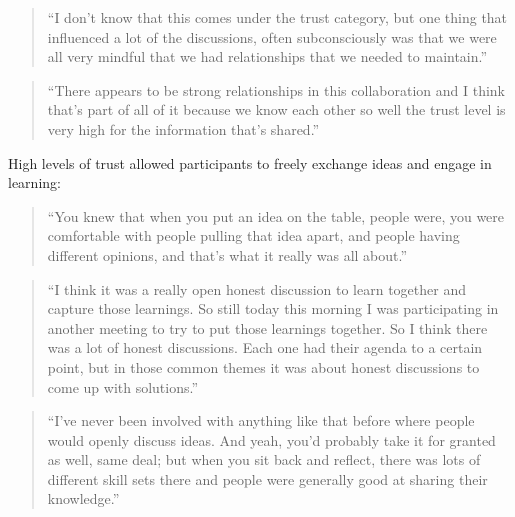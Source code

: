 \begin{quote}
\small
\enquote{I don't know that this comes under the trust category, but one thing that influenced a lot of the discussions, often subconsciously was that we were all very mindful that we had relationships that we needed to maintain.} \\
\end{quote}

\begin{quote}
\small
\enquote{There appears to be strong relationships in this collaboration and I think that's part of all of it because we know each other so well the trust level is very high for the information that's shared.} \\
\end{quote}

High levels of trust allowed participants to freely exchange ideas and engage in learning: 

\begin{quote}
\small
\enquote{You knew that when you put an idea on the table, people were, you were comfortable with people pulling that idea apart, and people having different opinions, and that’s what it really was all about.} \\
\end{quote}

\begin{quote}
\small
\enquote{I think it was a really open honest discussion to learn together and capture those learnings. So still today this morning I was participating in another meeting to try to put those learnings together. So I think there was a lot of honest discussions. Each one had their agenda to a certain point, but in those common themes it was about honest discussions to come up with solutions.} \\
\end{quote}

\begin{quote}
\small
\enquote{I've never been involved with anything like that before where people would openly discuss ideas. And yeah, you'd probably take it for granted as well, same deal; but when you sit back and reflect, there was lots of different skill sets there and people were generally good at sharing their knowledge.} \\
\end{quote}

